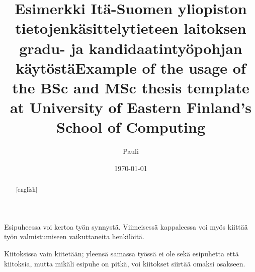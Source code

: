 \documentclass[gradu,finnish,biblatex,twoside,pdfa]{uefcsthesis}
\title{Esimerkki Itä-Suomen yliopiston tietojenkäsittelytieteen laitoksen gradu- ja kandidaatintyöpohjan käytöstä}
\title[english]{Example of the usage of the BSc and MSc thesis template at University of Eastern Finland's School of Computing}
\author{Pauli}{Miettinen}
\date{\today}
\begin{document}
\maketitle
\begin{abstract}
  
\end{abstract}
\begin{abstract}[english]
  
\end{abstract}

\frontmatter
\begin{preface}
  Esipuheessa voi kertoa työn synnystä. Viimeisessä kappaleessa voi myös kiittää työn valmistumiseen vaikuttaneita henkilöitä.
\end{preface}
\begin{acknowledgements}
  Kiitoksissa vain kiitetään; yleensä samassa työssä ei ole sekä esipuhetta että kiitoksia, mutta mikäli esipuhe on pitkä, voi kiitokset siirtää omaksi osakseen.
\end{acknowledgements}
\tableofcontents

\mainmatter



\printbibliography[heading=bibintoc] %

\backmatter
\begin{appendices}
  
\end{appendices}
\end{document}
